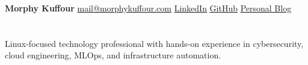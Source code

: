 \documentclass[a4paper,11pt]{article}
\begin{document}
  \textbf{Morphy Kuffour} \textbar{} \href{mailto:mail@morphykuffour.com}{mail@morphykuffour.com} \textbar{} \href{https://www.linkedin.com/in/morphy-kuffour/}{LinkedIn} \textbar{} \href{https://github.com/morph-k}{GitHub} \textbar{} \href{https://morphykuffour.github.io/}{Personal Blog} 

\vspace{-13pt}

\section{}
Linux-focused technology professional with hands-on experience in cybersecurity, cloud engineering, MLOps, and infrastructure automation. 

\end{document}
